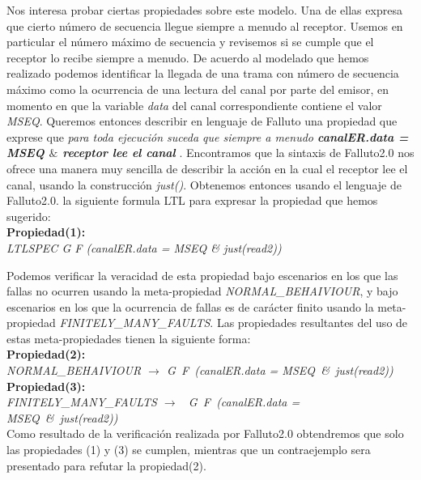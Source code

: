 \documentclass[titlepage, 12pt]{book}
\begin{document}
Nos interesa probar ciertas propiedades sobre este modelo. Una de ellas expresa que cierto n\'umero de secuencia llegue siempre a menudo al receptor. Usemos en particular el n\'umero m\'aximo de secuencia y revisemos si se cumple que el receptor lo recibe siempre a menudo. De acuerdo al modelado que hemos realizado podemos identificar la llegada de una trama con n\'umero de secuencia m\'aximo como la ocurrencia de una lectura del canal por parte del emisor, en momento en que la variable \textit{data} del canal correspondiente contiene el valor \textit{MSEQ}. Queremos entonces describir en lenguaje de Falluto una propiedad que exprese que \textit{para toda ejecuci\'on suceda que siempre a menudo \textbf{canalER.data = MSEQ $\&$ receptor lee el canal }}. Encontramos que la sintaxis de Falluto2.0 nos ofrece una manera muy sencilla de describir la acci\'on en la cual el receptor lee el canal, usando la construcci\'on \textit{just()}. Obtenemos entonces usando el lenguaje de Falluto2.0. la siguiente formula LTL para expresar la propiedad que hemos sugerido: \\

\noindent \textbf{Propiedad(1):}\\ \textit{LTLSPEC G F (canalER.data = MSEQ \& just(read2))}

Podemos verificar la veracidad de esta propiedad bajo escenarios en los que las fallas no ocurren usando la meta-propiedad \textit{NORMAL\_BEHAIVIOUR}, y bajo escenarios en los que la ocurrencia de fallas es de car\'acter finito usando la meta-propiedad \textit{FINITELY\_MANY\_FAULTS}. Las propiedades resultantes del uso de estas meta-propiedades tienen la siguiente forma:\\

\noindent \textbf{Propiedad(2):}\\ \textit{NORMAL\_BEHAIVIOUR $\rightarrow$ G~F~(canalER.data = MSEQ~\&~just(read2))}\\

\noindent \textbf{Propiedad(3):}\\ \textit{FINITELY\_MANY\_FAULTS $\rightarrow$ ~G~F~(canalER.data = MSEQ~\&~just(read2))}\\


Como resultado de la verificaci\'on realizada por Falluto2.0 obtendremos que solo las propiedades (1) y (3) se cumplen, mientras que un contraejemplo sera presentado para refutar la propiedad(2). 
\end{document}
